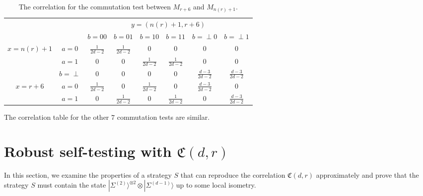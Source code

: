 \documentclass[11pt,letterpaper]{article}
\newcommand{\ket}[1]{|#1\rangle}
\newcommand{\x}{\otimes}
\newcommand{\1}{\mathbb{1}}
\newcommand{\EPR}[1]{\Sigma^{(#1)}}
\newcommand{\nr}{n(r)}
\newcommand{\fC}{\mathfrak{C}}
\theoremstyle{definition}
\begin{document}
\begin{table}[H]
\begin{center}
\begin{tabular}{|c|c||c|c|c|c|c|c|}
\hline
\multicolumn{2}{|c|}{} &
\multicolumn{6}{|c|}{$y=(\nr+1, r+6)$}\\
\cline{3-8}
\multicolumn{2}{|c|}{} &
$b = 00$ & $b=01$ & 
$b = 10$ & $b=11$ &
$b = \perp0$ & $b= \perp1$   \\
\hline
\hline
\multirow{3}{*}{$x = \nr+1$} & $a=0$ & $\frac{1}{2d-2}$ & $\frac{1}{2d-2}$ &  $0$
& $0$ & $0$ & $0$  \\
\cline{2-8}
&$a=1$ & $0$ & $0 $ & $\frac{1}{2d-2}$ 
&  $\frac{1}{2d-2}$ & $0$ & $0$  \\
\cline{2-8}
&$b=\perp$ & 0 & 0 & $0$ 
&  0 & $\frac{d-3}{2d-2}$ & $\frac{d-3}{2d-2} $  \\
\hline
\multirow{2}{*}{$x = r+6$} & $a=0$ & $\frac{1}{2d-2}$ & $0$ & $\frac{1}{2d-2}$ 
& $0$ & $\frac{d-3}{2d-2}$ & 0  \\
\cline{2-8}
&$a=1$ & $0$ & $\frac{1}{2d-2}$ & $0$ 
&  $\frac{1}{2d-2}$ & $0$ & $\frac{d-3}{2d-2}$  \\
\hline
\end{tabular}
\end{center}
\caption{The correlation for the commutation test between $M_{r+6}$ and $M_{\nr+1}$.}
\label{tbl:comm}
\end{table}
The correlation table for the other $7$ commutation tests are similar.

\section{Robust self-testing with $\fC(d,r)$}
\label{sec:main}
In this section, we examine the properties of a strategy $S$ that can reproduce the
correlation $\fC(d,r)$ approximately and 
prove that the strategy $S$ must contain the state $\ket{\EPR{2}}^{\x 2} \x \ket{\EPR{d-1}}$
up to some local isometry.
\end{document}
